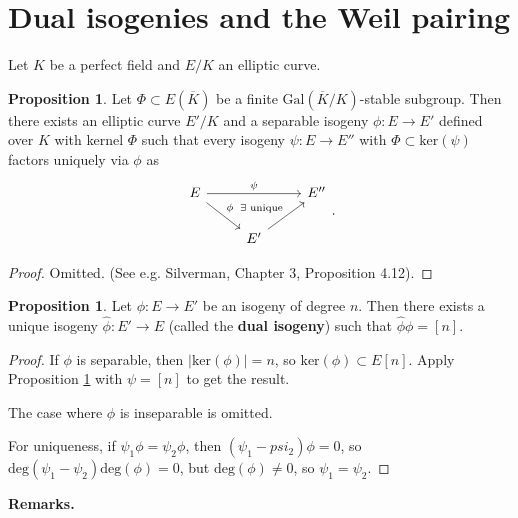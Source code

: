 \documentclass{article}
\theoremstyle{definition}
\newtheorem{prop}[theorem]{Proposition}
\begin{document}
\section{Dual isogenies and the Weil pairing}
Let $K$ be a perfect field and $E/K$ an elliptic curve.
\begin{prop}\label{prop14.1}
    Let $\Phi \subset E(\overline{K})$ be a finite $\text{Gal}(\overline{K}/K)$-stable subgroup. Then there exists an elliptic curve $E'/K$ and a separable isogeny $\phi : E \to E'$ defined over $K$ with kernel $\Phi$ such that every isogeny $\psi : E \to E''$ with $\Phi \subset \text{ker}(\psi)$ factors uniquely via $\phi$ as 
    $$\begin{tikzcd}[]
        E & & E''\\
        & E' & 
        \arrow["\psi", from=1-1, to=1-3]
        \arrow["\phi", from=1-1, to=2-2]
        \arrow["\exists \text{ unique}", from=2-2, to=1-3]
    \end{tikzcd}.$$
\end{prop}
\begin{proof}
    Omitted. (See e.g. Silverman, Chapter 3, Proposition 4.12).
\end{proof}
\begin{prop}\label{prop14.2}
    Let $\phi :E \to E'$ be an isogeny of degree $n$. Then there exists a unique isogeny $\widehat{\phi}:E' \to E$ (called the \textbf{dual isogeny}) such that $\widehat{\phi}\phi = [n]$.
\end{prop}
\begin{proof}
    If $\phi$ is separable, then $\left|\text{ker}(\phi)\right|=n$, so $\text{ker}(\phi) \subset E[n]$. Apply Proposition \ref{prop14.1} with $\psi = [n]$ to get the result.
    \vspace{1mm}
     
    The case where $\phi$ is inseparable is omitted.
    \vspace{1mm}
     
    For uniqueness, if $\psi_1 \phi = \psi_2 \phi$, then $(\psi_1-psi_2)\phi=0$, so $\text{deg}(\psi_1-\psi_2)\text{deg}(\phi) = 0$, but $\text{deg}(\phi) \neq 0$, so $\psi_1=\psi_2$.
\end{proof}
\textbf{Remarks.}
\end{document}
